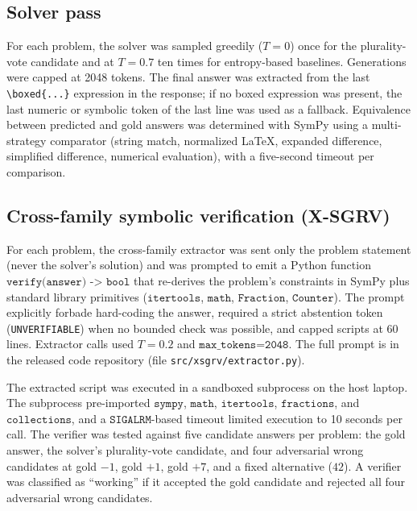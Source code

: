 \documentclass[11pt]{article}
\begin{document}
\subsection{Solver pass}

For each problem, the solver was sampled greedily ($T=0$) once for the plurality-vote candidate and at $T=0.7$ ten times for entropy-based baselines. Generations were capped at 2048 tokens. The final answer was extracted from the last \texttt{\textbackslash boxed\{...\}} expression in the response; if no boxed expression was present, the last numeric or symbolic token of the last line was used as a fallback. Equivalence between predicted and gold answers was determined with SymPy \citep{meurer2017sympy} using a multi-strategy comparator (string match, normalized LaTeX, expanded difference, simplified difference, numerical evaluation), with a five-second timeout per comparison.

\subsection{Cross-family symbolic verification (X-SGRV)}

For each problem, the cross-family extractor was sent only the problem statement (never the solver's solution) and was prompted to emit a Python function $\texttt{verify(answer) -> bool}$ that re-derives the problem's constraints in SymPy plus standard library primitives ($\texttt{itertools}$, $\texttt{math}$, $\texttt{Fraction}$, $\texttt{Counter}$). The prompt explicitly forbade hard-coding the answer, required a strict abstention token (\texttt{UNVERIFIABLE}) when no bounded check was possible, and capped scripts at 60 lines. Extractor calls used $T=0.2$ and $\texttt{max\_tokens=2048}$. The full prompt is in the released code repository (file \texttt{src/xsgrv/extractor.py}).

The extracted script was executed in a sandboxed subprocess on the host laptop. The subprocess pre-imported $\texttt{sympy}$, $\texttt{math}$, $\texttt{itertools}$, $\texttt{fractions}$, and $\texttt{collections}$, and a $\texttt{SIGALRM}$-based timeout limited execution to 10 seconds per call. The verifier was tested against five candidate answers per problem: the gold answer, the solver's plurality-vote candidate, and four adversarial wrong candidates at gold $-1$, gold $+1$, gold $+7$, and a fixed alternative ($42$). A verifier was classified as ``working'' if it accepted the gold candidate and rejected all four adversarial wrong candidates.
\end{document}

